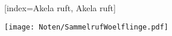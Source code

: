[index={Akela ruft, Akela ruft}]

\beginverse
\endverse
\texttt{[image: Noten/SammelrufWoelflinge.pdf]}

\endsong

\beginscripture{}
\endscripture


\begin{intersong}
\end{intersong}

